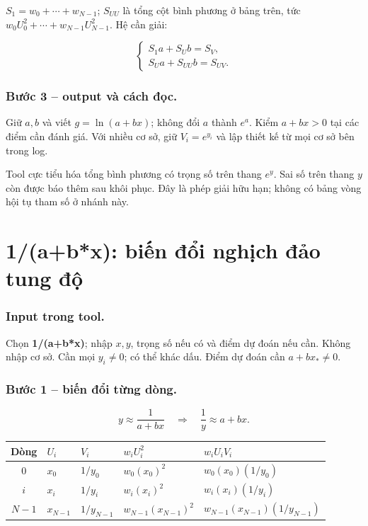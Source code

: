 $S_1=w_0+\cdots+w_{N-1}$; $S_{UU}$ là tổng cột bình phương ở bảng trên, tức $w_0U_0^2+\cdots+w_{N-1}U_{N-1}^2$. Hệ cần giải:

\[\boxed{\begin{cases}S_1a+S_Ub=S_V,\\S_Ua+S_{UU}b=S_{UV}.\end{cases}}\]

\subsubsection*{Bước 3 -- output và cách đọc.} Giữ $a,b$ và viết $g=\ln(a+bx)$; không đổi $a$ thành $e^a$. Kiểm $a+bx>0$ tại các điểm cần đánh giá. Với nhiều cơ sở, giữ $V_i=e^{y_i}$ và lập thiết kế từ mọi cơ sở bên trong log.

Tool cực tiểu hóa tổng bình phương có trọng số trên thang $e^y$. Sai số trên thang $y$ còn được báo thêm sau khôi phục. Đây là phép giải hữu hạn; không có bảng vòng hội tụ tham số ở nhánh này.

\examplebreak
\section{1/(a+b*x): biến đổi nghịch đảo tung độ}

\label{sec:ls-reciprocal}

\subsubsection*{Input trong tool.} Chọn \textbf{1/\allowbreak{}(a+b*x)}; nhập $x,y$, trọng số nếu có và điểm dự đoán nếu cần. Không nhập cơ sở. Cần mọi $y_i\ne0$; có thể khác dấu. Điểm dự đoán cần $a+bx_*\ne0$.

\subsubsection*{Bước 1 -- biến đổi từng dòng.}\[y\approx\frac1{a+bx}\quad\Longrightarrow\quad\frac1y\approx a+bx.\]

\begin{center}\small\begin{tabular}{cllll}\toprule

Dòng&$U_i$&$V_i$&$w_iU_i^2$&$w_iU_iV_i$\\\midrule

$0$&$x_0$&$1/y_0$&$w_{0}(x_0)^2$&$w_{0}(x_0)(1/y_0)$\\

$i$&$x_{i}$&$1/y_{i}$&$w_{i}(x_{i})^2$&$w_{i}(x_{i})(1/y_{i})$\\

$N-1$&$x_{N-1}$&$1/y_{N-1}$&$w_{N-1}(x_{N-1})^2$&$w_{N-1}(x_{N-1})(1/y_{N-1})$\\

\bottomrule\end{tabular}\end{center}

